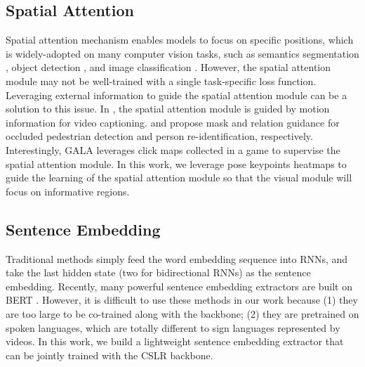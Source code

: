 \documentclass[acmsmall,screen]{acmart}
\begin{document}
\subsection{Spatial Attention}
Spatial attention mechanism enables models to focus on specific positions, which is widely-adopted on many computer vision tasks, such as semantics segmentation \cite{fu2019dual}, object detection \cite{woo2018cbam, cao2019gcnet}, and image classification \cite{woo2018cbam, cao2019gcnet, hu2018gather, wang2017residual, linsley2018learning}.
However, the spatial attention module may not be well-trained with a single task-specific loss function.
Leveraging external information to guide the spatial attention module can be a solution to this issue.
In \cite{chen2019motion}, the spatial attention module is guided by motion information for video captioning.
\cite{pang2019mask} and \cite{li2020relation} propose mask and relation guidance for occluded pedestrian detection and person re-identification, respectively.
Interestingly, GALA \cite{linsley2018learning} leverages click maps collected in a game to supervise the spatial attention module.
In this work, we leverage pose keypoints heatmaps to guide the learning of the spatial attention module so that the visual module will focus on informative regions.

\subsection{Sentence Embedding}
Traditional methods \cite{palangi2016deep, liu2019cross} simply feed the word embedding sequence into RNNs, and take the last hidden state (two for bidirectional RNNs) as the sentence embedding. 
Recently, many powerful sentence embedding extractors \cite{reimers2019sentence, gao2021simcse, carlsson2020semantic} are built on BERT \cite{kenton2019bert}.
However, it is difficult to use these methods in our work because (1) they are too large to be co-trained along with the backbone; (2) they are pretrained on spoken languages, which are totally different to sign languages represented by videos.
In this work, we build a lightweight sentence embedding extractor that can be jointly trained with the CSLR backbone.
\end{document}

